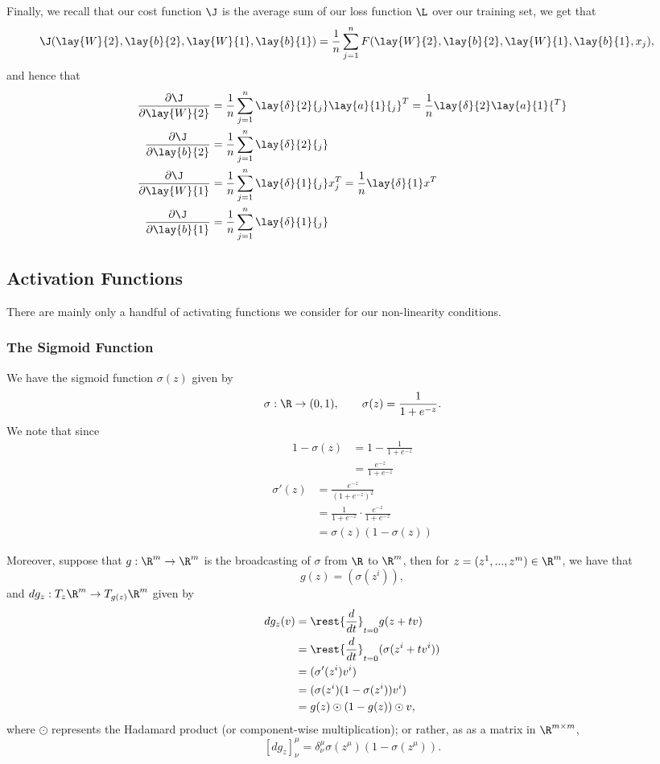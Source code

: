 Finally, we recall that our cost function $\J$ is the average sum of our loss function $\L$ over our training set, we get that
\begin{align*}
	\J(\lay{W}{2},\lay{b}{2},\lay{W}{1},\lay{b}{1})&=\frac{1}{n}\sum_{j=1}^nF(\lay{W}{2},\lay{b}{2},\lay{W}{1},\lay{b}{1},x_j),
\end{align*}
and hence that
\begin{align*}
	\frac{\partial\J}{\partial\lay{W}{2}}&=\frac{1}{n}\sum_{j=1}^n\lay{\delta}{2}{_j}\lay{a}{1}{_j}^T=\frac{1}{n}\lay{\delta}{2}\lay{a}{1}{^T}\\
	\frac{\partial\J}{\partial\lay{b}{2}}&=\frac{1}{n}\sum_{j=1}^n\lay{\delta}{2}{_j}\\
	\frac{\partial\J}{\partial\lay{W}{1}}&=\frac{1}{n}\sum_{j=1}^n\lay{\delta}{1}{_j}x_j^T=\frac{1}{n}\lay{\delta}{1}x^T\\
	\frac{\partial\J}{\partial\lay{b}{1}}&=\frac{1}{n}\sum_{j=1}^n\lay{\delta}{1}{_j}
\end{align*}


\subsection{Activation Functions}
There are mainly only a handful of activating functions we consider for our non-linearity conditions.

\subsubsection{The Sigmoid Function}
We have the sigmoid function $\sigma(z)$ given by
$$\sigma:\R\to(0,1),\qquad \sigma(z)=\frac{1}{1+e^{-z}}.$$
We note that since
\begin{align*}
	1-\sigma(z)&=1-\frac{1}{1+e^{-z}}\\
	&=\frac{e^{-z}}{1+e^{-z}}
\end{align*}
\begin{align*}
	\sigma'(z)&=\frac{e^{-z}}{(1+e^{-z})^2}\\
	&=\frac{1}{1+e^{-z}}\cdot\frac{e^{-z}}{1+e^{-z}}\\
	&=\sigma(z)(1-\sigma(z))
\end{align*}

Moreover, suppose that $g:\R^m\to\R^m$ is the broadcasting of $\sigma$ from $\R$ to $\R^m$, then for $z=(z^1,...,z^m)\in\R^m$, we have that
$$g(z)=(\sigma(z^i)),$$
and $dg_z:T_z\R^m\to T_{g(z)}\R^m$ given by
\begin{align*}
	dg_z(v)&=\rest{\frac{d}{dt}}_{t=0}g(z+tv)\\
	&=\rest{\frac{d}{dt}}_{t=0}(\sigma(z^i+tv^i))\\
	&=(\sigma'(z^i)v^i)\\
	&=(\sigma(z^i)(1-\sigma(z^i))v^i)\\
	&=g(z)\odot(1-g(z))\odot v,
\end{align*}
where $\odot$ represents the Hadamard product (or component-wise multiplication); or rather, as as a matrix in $\R^{m\times m}$,
$$[dg_z]^\mu_\nu=\delta^\mu_\nu\sigma(z^\mu)(1-\sigma(z^\mu)).$$



